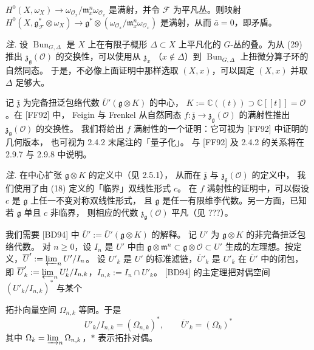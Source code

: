 
$H^0(X,\omega_X)\to\omega_{\mathcal{O}_x}/\mathfrak{m}^n_x\omega_{\mathcal{O}_x}$
是满射，并令 $\mathcal{F}$ 为平凡丛。则映射
$H^0(X,\mathfrak{g}^*_{\mathcal{F}}\otimes\omega_X)\to
\mathfrak{g}^*\otimes(\omega_{\mathcal{O}_x}/\mathfrak{m}^n_x\omega_{\mathcal{O}_x})$
是满射，从而 $\bar{a}=0$，即矛盾。

\emph{注.} 设 $\operatorname{Bun}_{G,\Delta}$ 是 $X$ 上在有限子概形
$\Delta\subset X$ 上平凡化的 $G$-丛的叠。为从 (29) 推出
$\mathfrak{z}_{\mathfrak{g}}(\mathcal{O})$ 的交换性，可以使用从 $\mathfrak{z}_x$
（$x\notin\Delta$）到 $\operatorname{Bun}_{G,\Delta}$ 上扭微分算子环的自然同态。
于是，不必像上面证明中那样选取 $(X,x)$，可以固定 $(X,x)$ 并取 $\Delta$ 足够大。

 记 $\bar{\mathfrak{z}}$ 为完备扭泛包络代数
$\overline{U}'(\mathfrak{g}\otimes K)$ 的中心，
$K:=\mathbb{C}((t))\supset\mathbb{C}[[t]]=\mathcal{O}$。在 [FF92] 中，
Feigin 与 Frenkel 从自然同态
$f:\bar{\mathfrak{z}}\to\mathfrak{z}_{\mathfrak{g}}(\mathcal{O})$
的满射性推出 $\mathfrak{z}_{\mathfrak{g}}(\mathcal{O})$ 的交换性。
我们将给出 $f$ 满射性的一个证明：它可视为 [FF92] 中证明的几何版本，
也可视为 2.4.2 末尾注的「量子化」。
与 [FF92] 及 2.4.2 的关系将在 2.9.7 与 2.9.8 中说明。

\emph{注.} 在中心扩张 $\mathfrak{g}\otimes K$ 的定义中（见 2.5.1），
从而在 $\bar{\mathfrak{z}}$ 与 $\mathfrak{z}_{\mathfrak{g}}(\mathcal{O})$ 的定义中，
我们使用了由 (18) 定义的「临界」双线性形式 $c$。
在 $f$ 满射性的证明中，可以假设 $c$ 是 $\mathfrak{g}$ 上任一不变对称双线性形式，
且 $\mathfrak{g}$ 是任一有限维李代数。另一方面，已知若 $\mathfrak{g}$ 单且 $c$ 非临界，
则相应的代数 $\mathfrak{z}_{\mathfrak{g}}(\mathcal{O})$ 平凡（见 ???）。

 我们需要 [BD94] 中
$\overline{U}':=\overline{U}'(\mathfrak{g}\otimes K)$ 的解释。
记 $U'$ 为 $\mathfrak{g}\otimes K$ 的非完备扭泛包络代数。
对 $n\ge 0$，设 $I_n$ 是 $U'$ 中由
$\mathfrak{g}\otimes\mathfrak{m}^n\subset\mathfrak{g}\otimes\mathcal{O}\subset U'$
生成的左理想。按定义，$\overline{U}':=\varprojlim_n U'/I_n$。
设 $U'_k$ 是 $U'$ 的标准滤链，$\overline{U}'_k$ 是 $U'_k$ 在
$\overline{U}'$ 中的闭包，即
$\overline{U}'_k:=\varprojlim_n U'_k/I_{n,k}$，$I_{n,k}:=I_n\cap U'_k$。
[BD94] 的主定理把对偶空间 $(U'_k/I_{n,k})^*$ 与某个


拓扑向量空间 $\Omega_{n,k}$ 等同。于是
\begin{equation}\tag{30}
  U'_k/I_{n,k}=(\Omega_{n,k})^*,\qquad \overline{U}'_k=(\Omega_k)^*
\end{equation}
其中 $\Omega_k=\varinjlim_n\Omega_{n,k}$，$*$ 表示拓扑对偶。


